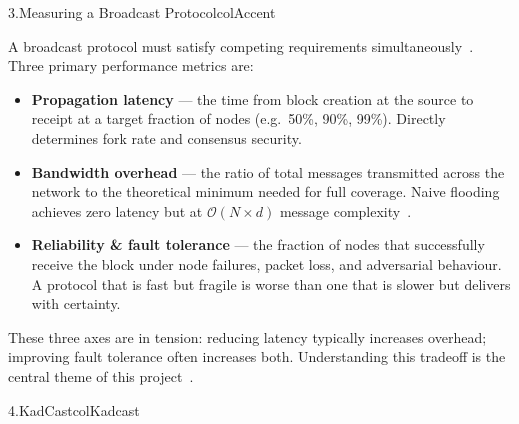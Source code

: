 \documentclass[final]{beamer}
\newcommand{\pbody}{\fontsize{21}{27}\selectfont}
\newlength{\colwidth}
\begin{document}
\begin{frame}[t]
\begin{columns}[T, totalwidth=0.97\paperwidth]
\begin{column}{\colwidth}
\vspace{6mm}


\begin{panel}{3.\enspace Measuring a Broadcast Protocol}{colAccent}
  \pbody\justifying

  A broadcast protocol must satisfy competing requirements simultaneously~\cite{decker2013,lai2025}. Three primary performance metrics are:

  \vspace{5pt}
   
  \begin{itemize}\setlength\itemsep{6pt}
    \item \textbf{Propagation latency} --- the time from block creation at the source to receipt at a target fraction of nodes (e.g.\ 50\%, 90\%, 99\%). Directly determines fork rate and consensus security.
    \item \textbf{Bandwidth overhead} --- the ratio of total messages transmitted across the network to the theoretical minimum needed for full coverage. Naive flooding achieves zero latency but at $\mathcal{O}{(N \times d)}$ message complexity~\cite{decker2013}.
    \item \textbf{Reliability \& fault tolerance} --- the fraction of nodes that successfully receive the block under node failures, packet loss, and adversarial behaviour. A protocol that is fast but fragile is worse than one that is slower but delivers with certainty.
  \end{itemize}

  \vspace{6pt}

  These three axes are in tension: reducing latency typically increases overhead; improving fault tolerance often increases both. Understanding this tradeoff is the central theme of this project~\cite{lai2025}. 
\end{panel}


\vspace{6mm}


\begin{panel}{4.\enspace KadCast}{colKadcast}
  \pbody\justifying


\end{panel}
\end{column}
\end{columns}
\end{frame}
\end{document}
